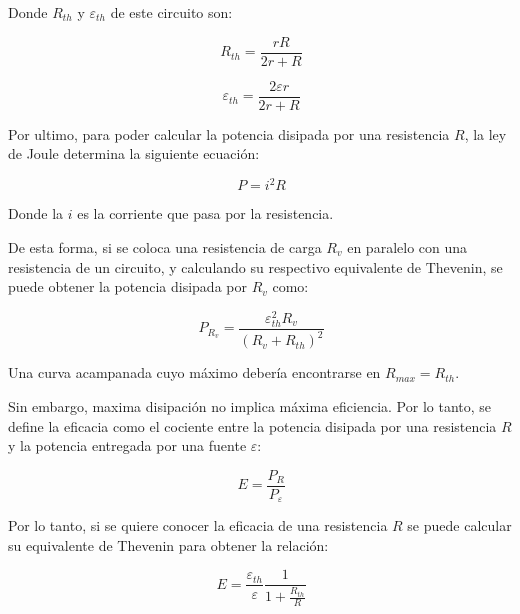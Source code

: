 \documentclass[11pt,a4paper]{article}
\begin{document}
Donde $R_{th}$ y $\varepsilon_{th}$ de este circuito son:

\begin{equation}\label{Rth}
\ R_{th}= \frac{rR}{2r+R}
\end{equation}

\begin{equation}\label{Eth}
\ \varepsilon_{th}= \frac{2\varepsilon r}{2r+R}
\end{equation}

Por ultimo, para poder calcular la potencia disipada por una resistencia $R$, la ley de Joule \cite{Trelles} determina la siguiente ecuación:

\begin{equation}\label{Joule}
\ P = i^2 R
\end{equation}

Donde la $i$ es la corriente que pasa por la resistencia. 

De esta forma, si se coloca una resistencia de carga $R_{v}$ en paralelo con una resistencia de un circuito, y calculando su respectivo equivalente de Thevenin, se puede obtener la potencia disipada por $R_{v}$ como:

\begin{equation}\label{Pot}
\ P_{R_{v}}=\frac{\varepsilon_{th}^2 R_{v}}{(R_{v}+R_{th})^2}
\end{equation}

Una curva acampanada cuyo máximo debería encontrarse en $R_{max} = R_{th}$.

Sin embargo, maxima disipación no implica máxima eficiencia. Por lo tanto, se define la eficacia como el cociente entre la potencia disipada por una resistencia $R$ y la potencia entregada por una fuente $\varepsilon$:

\begin{equation}\label{eficacia}
\ E=\frac{P_{R}}{P_{\varepsilon}}
\end{equation}

Por lo tanto, si se quiere conocer la eficacia de una resistencia $R$ se puede calcular su equivalente de Thevenin para obtener la relación:

\begin{equation}\label{efi}
\ E= \frac{\varepsilon_{th}}{\varepsilon}\frac{1}{1+\frac{R_{th}}{R}}
\end{equation}

\end{document}
